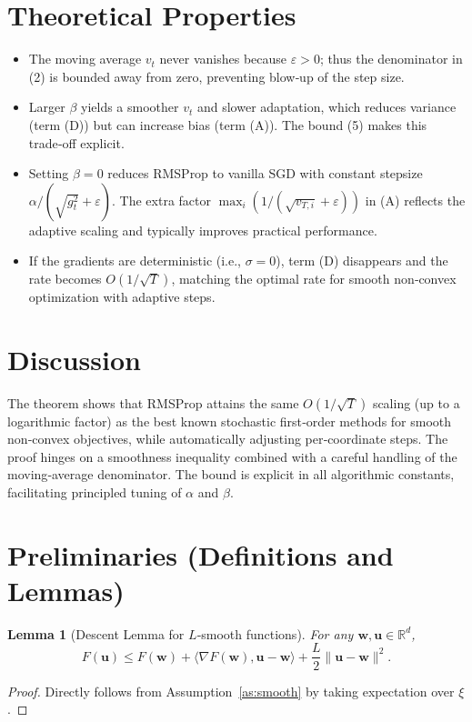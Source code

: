 \documentclass{article}
\newtheorem{lemma}{Lemma}
\newcommand{\R}{\mathbb{R}}
\begin{document}
\section*{Theoretical Properties}
\begin{itemize}[leftmargin=*]
\item[\textbf{Stability:}] The moving average $v_{t}$ never vanishes because $\varepsilon>0$; thus the denominator in (2) is bounded away from zero, preventing blow‑up of the step size.
\item[\textbf{Hyper‑parameter Sensitivity:}] Larger $\beta$ yields a smoother $v_{t}$ and slower adaptation, which reduces variance (term (D)) but can increase bias (term (A)). The bound (5) makes this trade‑off explicit.
\item[\textbf{Comparison to SGD:}] Setting $\beta=0$ reduces RMSProp to vanilla SGD with constant stepsize $\alpha/(\sqrt{g_{t}^{2}}+\varepsilon)$. The extra factor $\max_{i}(1/(\sqrt{v_{T,i}}+\varepsilon))$ in (A) reflects the adaptive scaling and typically improves practical performance.
\item[\textbf{Special Cases:}] If the gradients are deterministic (i.e., $\sigma=0$), term (D) disappears and the rate becomes $O(1/\sqrt{T})$, matching the optimal rate for smooth non‑convex optimization with adaptive steps.
\end{itemize}

\section*{Discussion}
The theorem shows that RMSProp attains the same $O(1/\sqrt{T})$ scaling (up to a logarithmic factor) as the best known stochastic first‑order methods for smooth non‑convex objectives, while automatically adjusting per‑coordinate steps. The proof hinges on a smoothness inequality combined with a careful handling of the moving‑average denominator. The bound is explicit in all algorithmic constants, facilitating principled tuning of $\alpha$ and $\beta$.

\newpage
\section*{Preliminaries (Definitions and Lemmas)}
\begin{lemma}[Descent Lemma for $L$‑smooth functions]\label{lem:descent}
For any $\mathbf w,\mathbf u\in\R^{d}$,
\[
F(\mathbf u)\le F(\mathbf w)+\langle\nabla F(\mathbf w),\mathbf u-\mathbf w\rangle+\frac{L}{2}\|\mathbf u-\mathbf w\|^{2}.
\]
\end{lemma}
\begin{proof}
Directly follows from Assumption~\ref{as:smooth} by taking expectation over $\xi$.
\end{proof}
\end{document}
